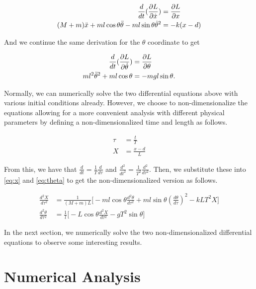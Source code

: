 \documentclass[12pt]{article}
\begin{document}
\begin{align}
        \frac{d}{dt} (\frac{\partial L}{\partial \dot{x}}) &= \frac{\partial L}{\partial x} \\
    (M+m)\Ddot{x} + ml\cos{\theta}\Ddot{\theta} - ml\sin{\theta}\dot{\theta}^2 &= 
     -k(x-d) \label{eq:x}
\end{align}
     
And we continue the same derivation for the $\theta$ coordinate to get

\begin{align}
    \frac{d}{dt} (\frac{\partial L}{\partial \dot{\theta}}) &= \frac{\partial L}{\partial \theta} \\
    ml^2\Ddot{\theta}^2 + ml\cos{\theta} &= -mgl\sin{\theta} \label{eq:theta}.
\end{align}

Normally, we can numerically solve the two differential equations above with various initial conditions already. However, we choose to non-dimensionalize the equations allowing for a more convenient analysis with different physical parameters by defining a non-dimensionalized time and length as follows.

\begin{align}
    \tau &= \frac{t}{T} \label{eq:tau} \\
    X &= \frac{x-d}{L} \label{eq:X}
\end{align}

From this, we have that $\frac{d}{dt} = \frac{1}{T} \frac{d}{d\tau}$ and $\frac{d^2}{dt^2} = \frac{1}{T^2} \frac{d^2}{d\tau^2}$. Then, we substitute these into \autoref{eq:x} and \autoref{eq:theta} to get the non-dimensionalized version as follows.

\begin{align}
    \frac{d^2X}{d\tau^2} &= \frac{1}{(M+m)L} \big[ -ml\cos{\theta} \frac{d^2\theta}{d\tau^2} + ml\sin{\theta}(\frac{d\theta}{d\tau})^2 - kLT^2X \big] \label{eq:nond_X} \\
    \frac{d^2\theta}{d\tau^2} &= \frac{1}{l} \big[ -L\cos{\theta}\frac{d^2X}{d\tau^2} - gT^2\sin{\theta} \big] \label{eq:nond_theta}
\end{align}

In the next section, we numerically solve the two non-dimensionalized differential equations to observe some interesting results.

\section{Numerical Analysis}
\end{document}
